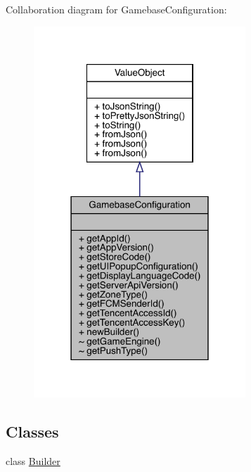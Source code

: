 Collaboration diagram for Gamebase\+Configuration\+:
\nopagebreak
\begin{figure}[H]
\begin{center}
\leavevmode
\includegraphics[width=226pt]{classcom_1_1toast_1_1android_1_1gamebase_1_1_gamebase_configuration__coll__graph}
\end{center}
\end{figure}
\subsection*{Classes}
\begin{DoxyCompactItemize}
\item 
class \hyperlink{classcom_1_1toast_1_1android_1_1gamebase_1_1_gamebase_configuration_1_1_builder}{Builder}
\end{DoxyCompactItemize}
